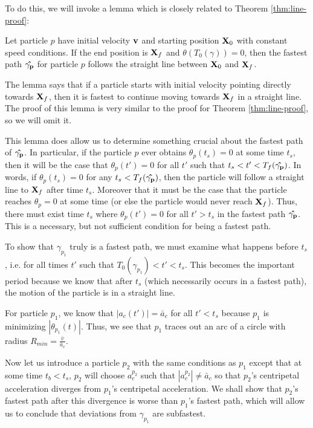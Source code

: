 To do this, we will invoke a lemma which is closely related to Theorem \ref{thm:line-proof}:

\begin{lemma}
  Let particle $p$ have initial velocity $\mathbf{v}$ and starting position $\mathbf{X}_0$ with constant speed conditions. If the end position is $\mathbf{X}_f$ and $\theta(T_0(\gamma)) = 0$, then the fastest path $\mathbf{\hat{\gamma_p}}$ for particle $p$ follows the straight line between $\mathbf{X}_0$ and $\mathbf{X}_f$.
\end{lemma}

The lemma says that if a particle starts with initial velocity pointing directly towards $\mathbf{X}_f$, then it is fastest to continue moving towards $\mathbf{X}_f$ in a straight line. The proof of this lemma is very similar to the proof for Theorem \ref{thm:line-proof}, so we will omit it.

This lemma does allow us to determine something crucial about the fastest path of $\mathbf{\hat{\gamma_{p}}}$. In particular, if the particle $p$ ever obtains $\theta_p(t_s) = 0$ at some time $t_s$, then it will be the case that $\theta_p(t') = 0$ for all $t'$ such that $t_s < t' < T_f(\mathbf{\hat{\gamma_p}})$. In words, if $\theta_p(t_s) = 0$ for any $t_s < T_f(\mathbf{\hat{\gamma_p}})$, then the particle will follow a straight line to $\mathbf{X}_f$ after time $t_s$. Moreover that it must be the case that the particle reaches $\theta_p = 0$ at some time (or else the particle would never reach $\mathbf{X}_f$). Thus, there must exist time $t_s$ where $\theta_p(t') = 0$ for all $t' > t_s$ in the fastest path $\mathbf{\hat{\gamma_p}}$. This is a necessary, but not sufficient condition for being a fastest path.

To show that $\gamma_{p_1}$ truly is a fastest path, we must examine what happens before $t_s$, i.e. for all times $t'$ such that $T_0(\gamma_{p_1}) < t' < t_s$. This becomes the important period because we know that after $t_s$ (which necessarily occurs in a fastest path), the motion of the particle is in a straight line.

For particle $p_1$, we know that $|a_c(t')| = \bar{a}_c$ for all $t' < t_s$ because $p_1$ is minimizing $|\theta_{p_1}(t)|$. Thus, we see that $p_1$ traces out an arc of a circle with radius $R_{min} = \frac{\bar{v}}{\bar{a}_c}$.

Now let us introduce a particle $p_2$ with the same conditions as $p_1$ except that at some time $t_b < t_s$, $p_2$ will choose $a^{p_2}_c$ such that $|a^{p_2}_c| \neq \bar{a}_c$ so that $p_2$'s centripetal acceleration diverges from $p_1$'s centripetal acceleration. We shall show that $p_2$'s fastest path after this divergence is worse than $p_1$'s fastest path, which will allow us to conclude that deviations from $\gamma_{p_1}$ are subfastest.

